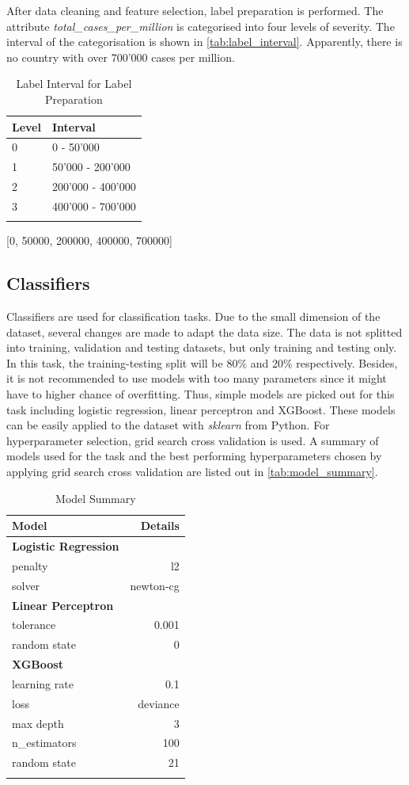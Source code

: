 \documentclass[10pt, a4paper, twocolumn]{article} %
\begin{document}
After data cleaning and feature selection, label preparation is performed. The attribute \emph{total\_cases\_per\_million} 
is categorised into four levels of severity. The interval of the categorisation is shown in \autoref{tab:label_interval}. 
Apparently, there is no country with over 700'000 cases per million. 
\begin{table}
	\caption{Label Interval for Label Preparation}
	\centering
	\begin{tabular}{ll}
		\toprule
		\textbf{Level} & \textbf{Interval} \\
		\midrule
		0 & 0 - 50'000 \\
		1 & 50'000 - 200'000 \\
		2 & 200'000 - 400'000 \\
		3 & 400'000 - 700'000\\
		\bottomrule
	\label{tab:label_interval}
	\end{tabular}
\end{table}
[0, 50000, 200000, 400000, 700000]
\subsection{Classifiers}
Classifiers are used for classification tasks. Due to the small dimension of the dataset, several changes are made to 
adapt the data size. The data is not splitted into training, validation and testing datasets, but only training and 
testing only. In this task, the training-testing split will be 80\% and 20\% respectively. Besides, it is not recommended 
to use models with too many parameters since it might have to higher chance of overfitting. Thus, simple models are 
picked out for this task including logistic regression, linear perceptron and XGBoost. These models can be easily 
applied to the dataset with \emph{sklearn} from Python. For hyperparameter selection, grid search cross validation 
is used. A summary of models used for the task and the best performing hyperparameters chosen by applying grid search 
cross validation are listed out in \autoref{tab:model_summary}.
\begin{table}
	\caption{Model Summary}
	\centering
	\begin{tabular}{lr}
		\toprule
		\textbf{Model} & \textbf{Details} \\
		\toprule
		\textbf{Logistic Regression} & \\ 
		penalty & l2 \\
		solver & newton-cg \\
		\midrule
		\textbf{Linear Perceptron} & \\
		tolerance & 0.001 \\
		random state & 0 \\
		\midrule
		\textbf{XGBoost} & \\
		learning rate & 0.1\\
		loss & deviance \\
		max depth & 3 \\
		n\_estimators & 100 \\
		random state & 21 \\
	\bottomrule
	\label{tab:model_summary}
	\end{tabular}
\end{table}
\end{document}
